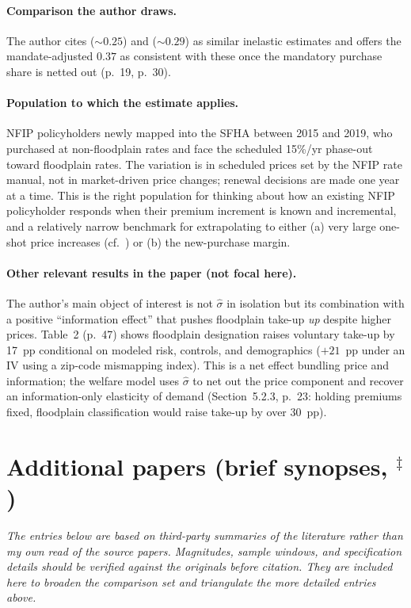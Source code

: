 \documentclass[11pt]{article}
\begin{document}
\paragraph{Comparison the author draws.}
The author cites \citet{bradt2021} ($\sim 0.25$) and \citet{wagner2022}
($\sim 0.29$) as similar inelastic estimates and offers the
mandate-adjusted $0.37$ as consistent with these once the mandatory
purchase share is netted out (p.~19, p.~30).

\paragraph{Population to which the estimate applies.}
NFIP policyholders newly mapped into the SFHA between 2015 and 2019, who
purchased at non-floodplain rates and face the scheduled 15\%/yr phase-out
toward floodplain rates. The variation is in scheduled prices set by the
NFIP rate manual, not in market-driven price changes; renewal decisions
are made one year at a time. This is the right population for thinking
about how an existing NFIP policyholder responds when their premium
increment is known and incremental, and a relatively narrow benchmark for
extrapolating to either (a) very large one-shot price increases (cf.\
\citet{collier2026}) or (b) the new-purchase margin.

\paragraph{Other relevant results in the paper (not focal here).}
The author's main object of interest is not $\hat\sigma$ in isolation but
its combination with a positive ``information effect'' that pushes
floodplain take-up \emph{up} despite higher prices. Table~2 (p.~47) shows
floodplain designation raises voluntary take-up by 17~pp conditional on
modeled risk, controls, and demographics ($+21$~pp under an IV using a
zip-code mismapping index). This is a net effect bundling price and
information; the welfare model uses $\hat\sigma$ to net out the price
component and recover an information-only elasticity of demand
(Section~5.2.3, p.~23: holding premiums fixed, floodplain classification
would raise take-up by over 30~pp).

\section{Additional papers (brief synopses, $^\ddagger$)}

\textit{The entries below are based on third-party summaries of the literature
rather than my own read of the source papers. Magnitudes, sample windows, and
specification details should be verified against the originals before citation.
They are included here to broaden the comparison set and triangulate the more
detailed entries above.}
\end{document}
